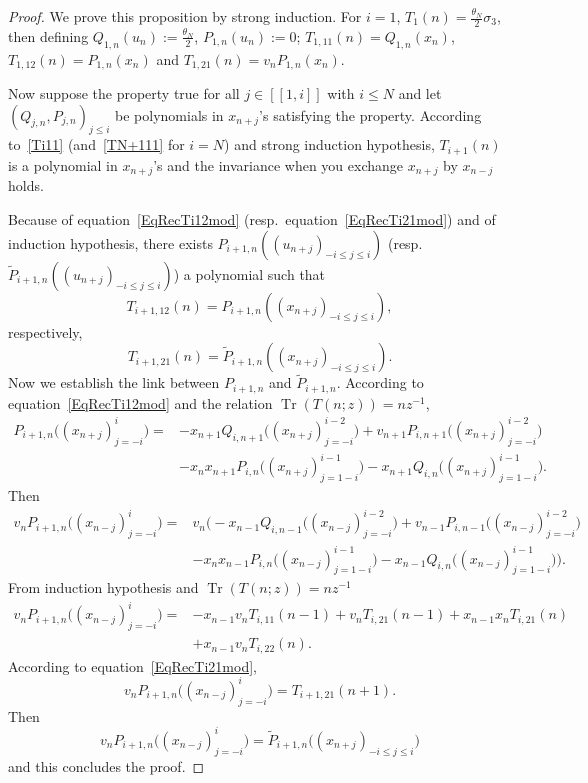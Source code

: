 \documentclass[pdftex]{sigma}%
\numberwithin{equation}{section}
\DeclareMathOperator{\Tr}{Tr}
\begin{document}
\begin{proof}
		We prove this proposition by strong induction.
For $i=1$, $T_1(n)=\frac{\theta_N}{2}\sigma_3$, then defining $Q_{1,n}(u_n):=\frac{\theta_N}{2}$, $P_{1,n}(u_n):=0$; $T_{1,11}(n)=Q_{1,n}(x_n)$, $T_{1,12}(n)=P_{1,n}(x_n)$ and $T_{1,21}(n)=v_nP_{1,n}(x_n)$.

		Now suppose the property true for all $j\in[[1,i]]$ with $i\leqslant N$ and let $(Q_{j,n},P_{j,n})_{j\leqslant i}$ be polynomials in $x_{n+j}$'s satisfying the property.
		According to~\eqref{Ti11} (and~\eqref{TN+111} for $i=N$) and strong induction hypothesis, $T_{i+1}(n)$ is a polynomial in $x_{n+j}$'s and the invariance when you exchange $x_{n+j}$ by $x_{n-j}$ holds.

		Because of equation~\eqref{EqRecTi12mod} (resp.\ equation~\eqref{EqRecTi21mod}) and of induction hypothesis, there exists $P_{i+1,n}((u_{n+j})_{-i\leqslant j\leqslant i})$ (resp.\ $\tilde{P}_{i+1,n}((u_{n+j})_{-i\leqslant j\leqslant i})$) a polynomial such that
\begin{equation*}
T_{i+1,12}(n)=P_{i+1,n}((x_{n+j})_{-i\leqslant j\leqslant i}),
\end{equation*}
respectively,
\begin{equation*}
T_{i+1,21}(n)=\tilde{P}_{i+1,n}((x_{n+j})_{-i\leqslant j\leqslant i}).
\end{equation*}
		Now we establish the link between $P_{i+1,n}$ and $\tilde{P}_{i+1,n}$. According to equation~\eqref{EqRecTi12mod} and the relation $\Tr(T(n;z))=nz^{-1}$,
\begin{align*}
P_{i+1,n}\big((x_{n+j})_{j=-i}^{i}\big)={}&-x_{n+1}Q_{i,n+1}\big((x_{n+j})_{j=-i}^{i-2}\big)
+v_{n+1}P_{i,n+1}\big((x_{n+j})_{j=-i}^{i-2}\big)
\\
&-x_nx_{n+1}P_{i,n}\big((x_{n+j})_{j=1-i}^{i-1}\big)
-x_{n+1}Q_{i,n}\big((x_{n+j})_{j=1-i}^{i-1}\big).
\end{align*}
		Then
\begin{align*} v_nP_{i+1,n}\big((x_{n-j})_{j=-i}^{i}\big)={}&v_n\big(-x_{n-1}Q_{i,n-1}\big((x_{n-j})_{j=-i}^{i-2}\big)
+v_{n-1}P_{i,n-1}\big((x_{n-j})_{j=-i}^{i-2}\big)
\\
&-x_nx_{n-1}P_{i,n}\big((x_{n-j})_{j=1-i}^{i-1}\big)-x_{n-1}Q_{i,n}\big((x_{n-j})_{j=1-i}^{i-1}\big)\big).
		\end{align*}
		From induction hypothesis and $\Tr(T(n;z))=nz^{-1}$
\begin{align*} v_nP_{i+1,n}\big((x_{n-j})_{j=-i}^{i}\big)={}&-x_{n-1}v_nT_{i,11}(n-1)+v_nT_{i,21}(n-1)+x_{n-1}x_nT_{i,21}(n)
\\
&+x_{n-1}v_nT_{i,22}(n).
\end{align*}
		According to equation~\eqref{EqRecTi21mod},
\begin{equation*}
v_nP_{i+1,n}\big((x_{n-j})_{j=-i}^{i}\big)=T_{i+1,21}(n+1).
\end{equation*}
		Then
\begin{equation*}
v_nP_{i+1,n}\big((x_{n-j})_{j=-i}^{i}\big)
=\tilde{P}_{i+1,n}\big((x_{n+j})_{-i\leqslant j\leqslant i}\big)
\end{equation*}		
and this concludes the proof.
\end{proof}
\end{document}
